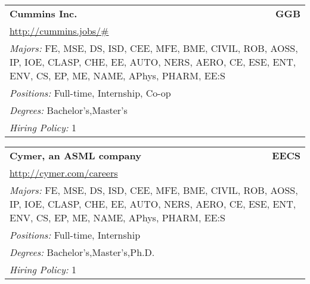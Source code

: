 \documentclass[twoside]{article}
\begin{document}
\begin{center}
\begin{multicols}{3}
\begin{FlushLeft}
\begin{minipage}{\columnwidth}\begin{tabularx}{.95\columnwidth}{Xr}
                 {\Large\bf Cummins Inc.} & {\Large\bf GGB}\\
    \multicolumn{2}{p{.95\columnwidth}}{\url{http://cummins.jobs/\#}}\\
    \multicolumn{2}{p{.95\columnwidth}}{\emph{Majors:} FE, MSE, DS, ISD, CEE, MFE, BME, CIVIL, ROB, AOSS, IP, IOE, CLASP, CHE, EE, AUTO, NERS, AERO, CE, ESE, ENT, ENV, CS, EP, ME, NAME, APhys, PHARM, EE:S}\\
    \multicolumn{2}{p{.95\columnwidth}}{\emph{Positions:} Full-time, Internship, Co-op}\\
    \multicolumn{2}{p{.95\columnwidth}}{\emph{Degrees:} Bachelor's,Master's}\\
    \multicolumn{2}{p{.95\columnwidth}}{\emph{Hiring Policy:} 1}\\
    \end{tabularx}
    
\end{minipage}
 
\begin{minipage}{\columnwidth}\begin{tabularx}{.95\columnwidth}{Xr}
                 {\Large\bf Cymer, an ASML company} & {\Large\bf EECS}\\
    \multicolumn{2}{p{.95\columnwidth}}{\url{http://cymer.com/careers}}\\
    \multicolumn{2}{p{.95\columnwidth}}{\emph{Majors:} FE, MSE, DS, ISD, CEE, MFE, BME, CIVIL, ROB, AOSS, IP, IOE, CLASP, CHE, EE, AUTO, NERS, AERO, CE, ESE, ENT, ENV, CS, EP, ME, NAME, APhys, PHARM, EE:S}\\
    \multicolumn{2}{p{.95\columnwidth}}{\emph{Positions:} Full-time, Internship}\\
    \multicolumn{2}{p{.95\columnwidth}}{\emph{Degrees:} Bachelor's,Master's,Ph.D.}\\
    \multicolumn{2}{p{.95\columnwidth}}{\emph{Hiring Policy:} 1}\\
    \end{tabularx}
    
\end{minipage}
 

\end{FlushLeft}
\end{multicols}
\end{center}
\end{document}
